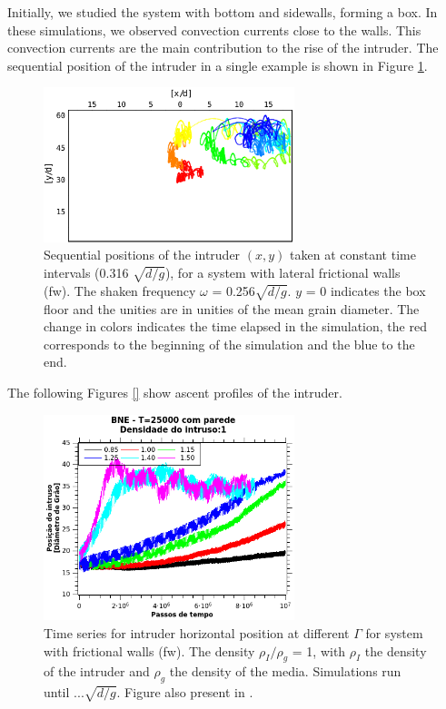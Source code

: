     Initially, we studied the system with bottom and sidewalls, forming a box. In these simulations, we observed convection currents close to the walls. This convection currents are the main contribution to the rise of the intruder. The sequential position of the intruder in a single example is shown in Figure \ref{fig:BNE_intruderwalls}.

\begin{figure}
    \centering
    \includegraphics[width=0.65\textwidth]{04-figuras/BNE_PositionWalls.pdf}
    \caption[BNE with walls: sample of intruder positions.]{Sequential positions of the intruder $(x, y)$ taken at constant time intervals (0.316 $\sqrt{d/g}$), for a system with lateral frictional walls (fw). The shaken frequency $\omega$ = 0.256$\sqrt{d/g}$. $y$ = 0 indicates the box floor and the unities are in unities of the mean grain diameter. The change in colors indicates the time elapsed in the simulation, the red corresponds to the beginning of the simulation and the blue to the end.}
    \label{fig:BNE_intruderwalls}
\end{figure}

    The following Figures \ref{} show ascent profiles of the intruder.

\begin{figure}
    \centering
    \includegraphics[width=0.65\textwidth]{04-figuras/BNE25000D1.png}
    \caption[BNE with frictional walls: $\rho_I/\rho_g$ = 1.]{Time series for intruder horizontal position at different $\Gamma$ for system with frictional walls (fw). The density $\rho_I/\rho_g$ = 1, with $\rho_I$ the density of the intruder and $\rho_g$ the density of the media. Simulations run until $...\sqrt{d/g}$. Figure also present in \cite{Large-deviation_quantification_of_boundary_conditions_on_the_Brazil_nut_effect}.}
    \label{fig:BNE25000_Parede}
\end{figure}

